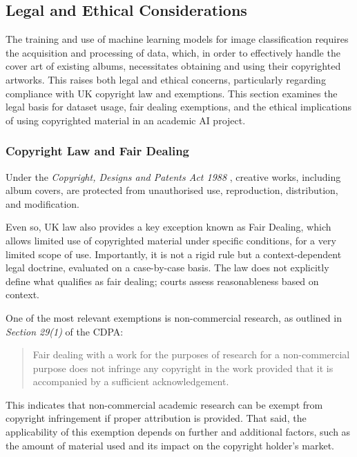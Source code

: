         \subsection{Legal and Ethical Considerations}
    
          The training and use of machine learning models for image classification requires the acquisition and processing of data, which, in order to effectively handle the cover art of existing albums, necessitates obtaining and using their copyrighted artworks. This raises both legal and ethical concerns, particularly regarding compliance with UK copyright law and exemptions. This section examines the legal basis for dataset usage, fair dealing exemptions, and the ethical implications of using copyrighted material in an academic AI project.
    
              \subsubsection{Copyright Law and Fair Dealing}
                  Under the \textit{Copyright, Designs and Patents Act 1988} \cite{cdpa1988}, creative works, including album covers, are protected from unauthorised use, reproduction, distribution, and modification.
          
                  Even so, UK law also provides a key exception known as Fair Dealing, which allows limited use of copyrighted material under specific conditions, for a very limited scope of use. Importantly, it is not a rigid rule but a context-dependent legal doctrine, evaluated on a case-by-case basis. The law does not explicitly define what qualifies as fair dealing; courts assess reasonableness based on context.
                  
                  One of the most relevant exemptions is non-commercial research, as outlined in \textit{Section 29(1)} of the CDPA:
                  \begin{quote}
                      Fair dealing with a work for the purposes of research for a non-commercial purpose does not infringe any copyright in the work provided that it is accompanied by a sufficient acknowledgement. \cite{cdpa1988}
                  \end{quote}
    
                  This indicates that non-commercial academic research can be exempt from copyright infringement if proper attribution is provided. That said, the applicability of this exemption depends on further and additional factors, such as the amount of material used and its impact on the copyright holder’s market.
    
